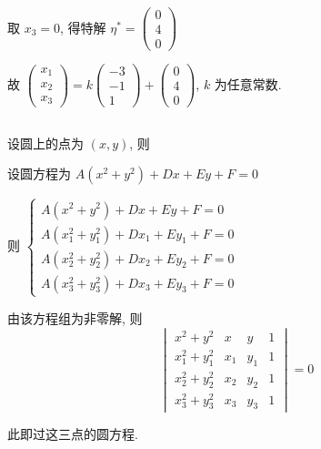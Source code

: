 		取 \( x_{3} = 0 \), 得特解 \( \eta^{*} = \begin{pmatrix}
			0 \\
			4 \\
			0
		\end{pmatrix} \)

		故 \( \begin{pmatrix}
			x_{1} \\
			x_{2} \\
			x_{3}
		\end{pmatrix} = k\begin{pmatrix}
			-3 \\
			-1 \\
			1
		\end{pmatrix} + \begin{pmatrix}
			0 \\
			4 \\
			0
		\end{pmatrix} \), \( k \) 为任意常数.


\subsection{} %


	\paragraph{} %
		设圆上的点为 \( (x, y) \), 则

		设圆方程为 \( A(x^{2}+y^{2}) + Dx + Ey + F = 0 \)

		则 \( \begin{cases}
			A(x^{2}+y^{2}) + Dx + Ey + F = 0                 \\
			A(x_{1}^{2}+y_{1}^{2}) + Dx_{1} + Ey_{1} + F = 0 \\
			A(x_{2}^{2}+y_{2}^{2}) + Dx_{2} + Ey_{2} + F = 0 \\
			A(x_{3}^{2}+y_{3}^{2}) + Dx_{3} + Ey_{3} + F = 0
		\end{cases} \)

		由该方程组为非零解, 则
		\[ \begin{vmatrix}
				x^{2}+y^{2}         & x     & y     & 1 \\
				x_{1}^{2}+y_{1}^{2} & x_{1} & y_{1} & 1 \\
				x_{2}^{2}+y_{2}^{2} & x_{2} & y_{2} & 1 \\
				x_{3}^{2}+y_{3}^{2} & x_{3} & y_{3} & 1
			\end{vmatrix} = 0 \]

		此即过这三点的圆方程.


